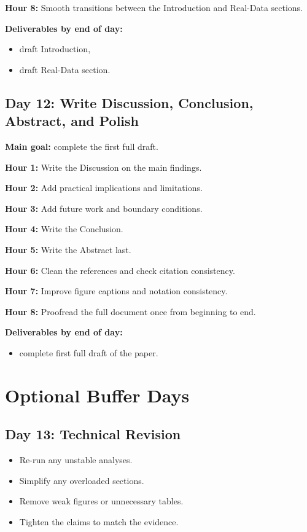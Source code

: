 \documentclass[11pt]{article}
\begin{document}
\textbf{Hour 8:} Smooth transitions between the Introduction and Real-Data sections.

\textbf{Deliverables by end of day:}
\begin{itemize}
    \item draft Introduction,
    \item draft Real-Data section.
\end{itemize}

\subsection*{Day 12: Write Discussion, Conclusion, Abstract, and Polish}
\textbf{Main goal:} complete the first full draft.

\textbf{Hour 1:} Write the Discussion on the main findings.

\textbf{Hour 2:} Add practical implications and limitations.

\textbf{Hour 3:} Add future work and boundary conditions.

\textbf{Hour 4:} Write the Conclusion.

\textbf{Hour 5:} Write the Abstract last.

\textbf{Hour 6:} Clean the references and check citation consistency.

\textbf{Hour 7:} Improve figure captions and notation consistency.

\textbf{Hour 8:} Proofread the full document once from beginning to end.

\textbf{Deliverables by end of day:}
\begin{itemize}
    \item complete first full draft of the paper.
\end{itemize}

\section{Optional Buffer Days}

\subsection*{Day 13: Technical Revision}
\begin{itemize}
    \item Re-run any unstable analyses.
    \item Simplify any overloaded sections.
    \item Remove weak figures or unnecessary tables.
    \item Tighten the claims to match the evidence.
\end{itemize}
\end{document}
